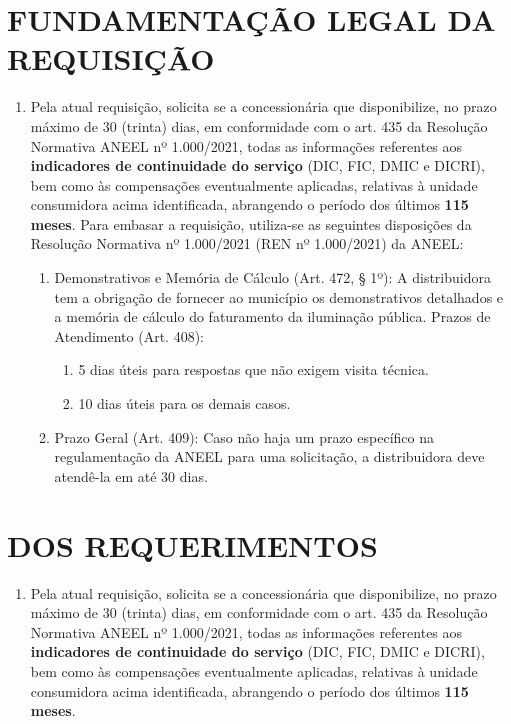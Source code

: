 \newcommand{\tipoRequerimento}{Solicitação de informação sobre os Indicadores de Continuidade}

\section{FUNDAMENTAÇÃO LEGAL DA REQUISIÇÃO}

\begin{enumerate}[resume]
\item Pela atual requisição, solicita se a concessionária que disponibilize, no prazo máximo de 30 (trinta) dias, em conformidade com o art. 435 da Resolução Normativa ANEEL nº 1.000/2021, todas as informações referentes aos \textbf{indicadores de continuidade do serviço} (DIC, FIC, DMIC e DICRI), bem como às compensações eventualmente aplicadas, relativas à unidade consumidora acima identificada, abrangendo o período dos últimos \textbf{115 meses}.
  Para embasar a requisição, utiliza-se as seguintes disposições da Resolução Normativa nº 1.000/2021 (REN nº 1.000/2021) da ANEEL:
  \begin{enumerate}
  \item
    Demonstrativos e Memória de Cálculo (Art. 472, § 1º): A distribuidora tem a obrigação de fornecer ao município os demonstrativos detalhados e a memória de cálculo do faturamento da iluminação pública. Prazos de Atendimento (Art. 408):
    \begin{enumerate}
      \item  
      5 dias úteis para respostas que não exigem visita técnica.
      \item 
      10 dias úteis para os demais casos.
    \end{enumerate}
  \item 
  Prazo Geral (Art. 409): Caso não haja um prazo específico na regulamentação da ANEEL para uma solicitação, a distribuidora deve atendê-la em até 30 dias.
  \end{enumerate}
\end{enumerate}

\section{DOS REQUERIMENTOS}

\begin{enumerate}[resume]
\item Pela atual requisição, solicita se a concessionária que disponibilize, no prazo máximo de 30 (trinta) dias, em conformidade com o art. 435 da Resolução Normativa ANEEL nº 1.000/2021, todas as informações referentes aos \textbf{indicadores de continuidade do serviço} (DIC, FIC, DMIC e DICRI), bem como às compensações eventualmente aplicadas, relativas à unidade consumidora acima identificada, abrangendo o período dos últimos \textbf{115 meses}.
\end{enumerate}

